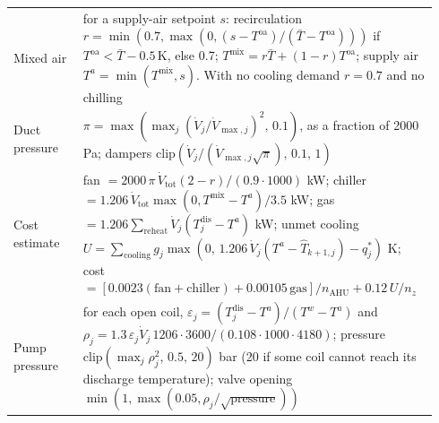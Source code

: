 \documentclass{article}
\begin{document}
\begin{table}[H]
\begin{tabular}{p{0.16\linewidth}p{0.78\linewidth}}
Mixed air & for a supply-air setpoint $s$: recirculation $r=\min(0.7,\max(0,(s-T^{\mathrm{oa}})/(\bar T-T^{\mathrm{oa}})))$ if $T^{\mathrm{oa}}<\bar T-0.5$\,K, else 0.7; $T^{\mathrm{mix}}=r\bar T+(1-r)T^{\mathrm{oa}}$; supply air $T^{a}=\min(T^{\mathrm{mix}},s)$. With no cooling demand $r=0.7$ and no chilling\\
Duct pressure & $\pi=\max(\max_j(\dot V_j/\dot V_{\max,j})^2,\,0.1)$, as a fraction of 2000\,Pa; dampers $\mathrm{clip}(\dot V_j/(\dot V_{\max,j}\sqrt{\pi}),\,0.1,\,1)$\\
Cost estimate & fan $=2000\,\pi\,\dot V_{\mathrm{tot}}(2-r)/(0.9\cdot1000)$ kW; chiller $=1.206\,\dot V_{\mathrm{tot}}\max(0,T^{\mathrm{mix}}-T^{a})/3.5$ kW; gas $=1.206\sum_{\mathrm{reheat}}\dot V_j(T^{\mathrm{dis}}_j-T^{a})$ kW; unmet cooling $U=\sum_{\mathrm{cooling}}g_j\max(0,\,1.206\,\dot V_j(T^{a}-\hat T_{k+1,j})-q^{*}_j)$ K; cost $=[0.0023(\mathrm{fan}+\mathrm{chiller})+0.00105\,\mathrm{gas}]/n_{\mathrm{AHU}}+0.12\,U/n_{z}$\\
Pump pressure & for each open coil, $\varepsilon_j=(T^{\mathrm{dis}}_j-T^{a})/(T^{w}-T^{a})$ and $\rho_j=1.3\,\varepsilon_j\dot V_j\,1206\cdot3600/(0.108\cdot1000\cdot4180)$; pressure $\mathrm{clip}(\max_j\rho_j^2,\,0.5,\,20)$ bar (20 if some coil cannot reach its discharge temperature); valve opening $\min(1,\max(0.05,\rho_j/\sqrt{\text{pressure}}))$\\\bottomrule
\end{tabular}
\end{table}
\end{document}

